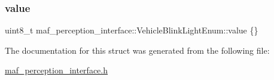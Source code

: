 \subsubsection{\texorpdfstring{value}{value}}
{\footnotesize\ttfamily uint8\+\_\+t maf\+\_\+perception\+\_\+interface\+::\+Vehicle\+Blink\+Light\+Enum\+::value \{\}}



The documentation for this struct was generated from the following file\+:\begin{DoxyCompactItemize}
\item 
\hyperlink{maf__perception__interface_8h}{maf\+\_\+perception\+\_\+interface.\+h}\end{DoxyCompactItemize}
